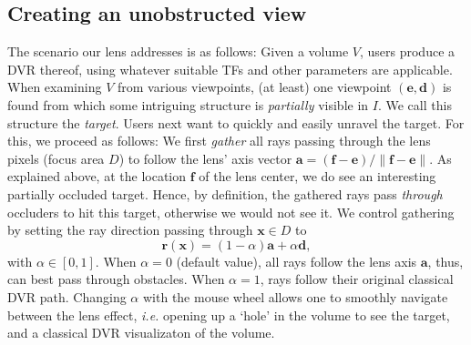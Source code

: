 \vspace{-0.15cm}
\subsection{Creating an unobstructed view}
\label{sec:gathering}
%
The scenario our lens addresses is as follows: Given a volume $V$, users produce a DVR thereof, using whatever suitable TFs and other parameters are applicable. When examining $V$ from various viewpoints, (at least) one viewpoint $(\mathbf{e},\mathbf{d})$ is found from which some intriguing structure is \emph{partially} visible in $I$. We call this structure the \emph{target}. Users next want to quickly and easily unravel the target. For this, we proceed as follows: We first \emph{gather} all rays passing through the lens pixels (focus area $D$) to follow the lens' axis vector $\mathbf{a} = (\mathbf{f} - \mathbf{e}) / \| \mathbf{f} - \mathbf{e} \|$. As explained above, at the location $\mathbf{f}$ of the lens center, we do see an interesting partially occluded target. Hence, by definition, the gathered rays pass \emph{through} occluders to hit this target, otherwise we would not see it. We control gathering by setting the ray direction passing through $\mathbf{x} \in D$ to
%
\begin{equation}
\mathbf{r}(\mathbf{x}) = (1-\alpha) \mathbf{a} + \alpha \mathbf{d},
\label{eqn:gathering}
\end{equation}
%
with $\alpha \in [0,1]$. When $\alpha=0$ (default value), all rays follow the lens axis $\mathbf{a}$, thus, can best pass through obstacles. When $\alpha=1$, rays follow their original classical DVR path. Changing $\alpha$ with the mouse wheel allows one to smoothly navigate between the lens effect, \emph{i.e.} opening up a `hole' in the volume to see the target, and a classical DVR visualizaton of the volume.
%
\vspace{-0.15cm}
